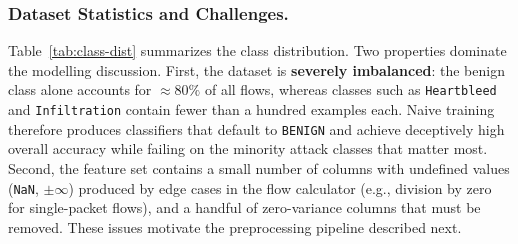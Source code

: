 \subsubsection*{Dataset Statistics and Challenges.}
Table~\ref{tab:class-dist} summarizes the class distribution. Two properties dominate the modelling discussion. First, the dataset is \textbf{severely imbalanced}: the benign class alone accounts for $\approx 80\%$ of all flows, whereas classes such as \texttt{Heartbleed} and \texttt{Infiltration} contain fewer than a hundred examples each. Naive training therefore produces classifiers that default to \texttt{BENIGN} and achieve deceptively high overall accuracy while failing on the minority attack classes that matter most. Second, the feature set contains a small number of columns with undefined values (\texttt{NaN}, $\pm\infty$) produced by edge cases in the flow calculator (e.g., division by zero for single-packet flows), and a handful of zero-variance columns that must be removed. These issues motivate the preprocessing pipeline described next.
